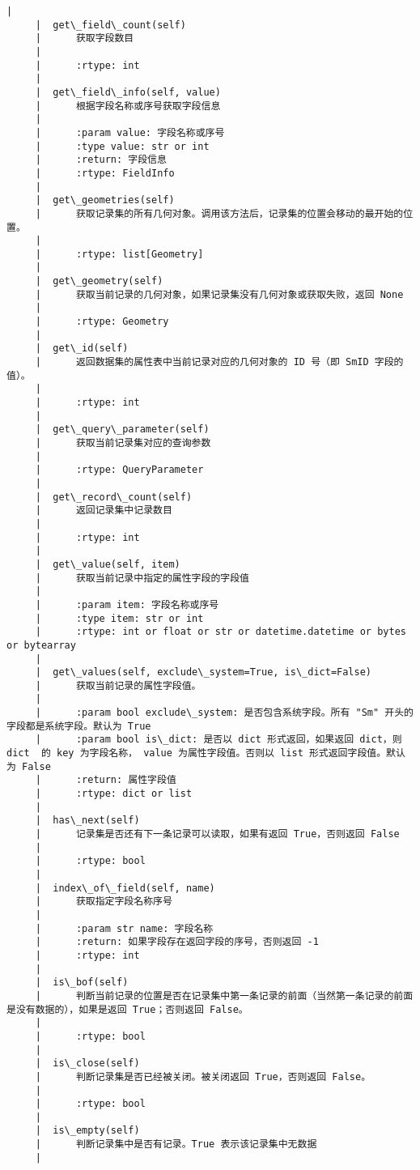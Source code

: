 \documentclass[11pt]{article}
\begin{document}
\begin{Verbatim}[commandchars=\\\{\}]
     |  
     |  get\_field\_count(self)
     |      获取字段数目
     |      
     |      :rtype: int
     |  
     |  get\_field\_info(self, value)
     |      根据字段名称或序号获取字段信息
     |      
     |      :param value: 字段名称或序号
     |      :type value: str or int
     |      :return: 字段信息
     |      :rtype: FieldInfo
     |  
     |  get\_geometries(self)
     |      获取记录集的所有几何对象。调用该方法后，记录集的位置会移动的最开始的位置。
     |      
     |      :rtype: list[Geometry]
     |  
     |  get\_geometry(self)
     |      获取当前记录的几何对象，如果记录集没有几何对象或获取失败，返回 None
     |      
     |      :rtype: Geometry
     |  
     |  get\_id(self)
     |      返回数据集的属性表中当前记录对应的几何对象的 ID 号（即 SmID 字段的值）。
     |      
     |      :rtype: int
     |  
     |  get\_query\_parameter(self)
     |      获取当前记录集对应的查询参数
     |      
     |      :rtype: QueryParameter
     |  
     |  get\_record\_count(self)
     |      返回记录集中记录数目
     |      
     |      :rtype: int
     |  
     |  get\_value(self, item)
     |      获取当前记录中指定的属性字段的字段值
     |      
     |      :param item: 字段名称或序号
     |      :type item: str or int
     |      :rtype: int or float or str or datetime.datetime or bytes or bytearray
     |  
     |  get\_values(self, exclude\_system=True, is\_dict=False)
     |      获取当前记录的属性字段值。
     |      
     |      :param bool exclude\_system: 是否包含系统字段。所有 "Sm" 开头的字段都是系统字段。默认为 True
     |      :param bool is\_dict: 是否以 dict 形式返回，如果返回 dict，则 dict  的 key 为字段名称， value 为属性字段值。否则以 list 形式返回字段值。默认为 False
     |      :return: 属性字段值
     |      :rtype: dict or list
     |  
     |  has\_next(self)
     |      记录集是否还有下一条记录可以读取，如果有返回 True，否则返回 False
     |      
     |      :rtype: bool
     |  
     |  index\_of\_field(self, name)
     |      获取指定字段名称序号
     |      
     |      :param str name: 字段名称
     |      :return: 如果字段存在返回字段的序号，否则返回 -1
     |      :rtype: int
     |  
     |  is\_bof(self)
     |      判断当前记录的位置是否在记录集中第一条记录的前面（当然第一条记录的前面是没有数据的），如果是返回 True；否则返回 False。
     |      
     |      :rtype: bool
     |  
     |  is\_close(self)
     |      判断记录集是否已经被关闭。被关闭返回 True，否则返回 False。
     |      
     |      :rtype: bool
     |  
     |  is\_empty(self)
     |      判断记录集中是否有记录。True 表示该记录集中无数据
     |      

\end{Verbatim}
\end{document}

